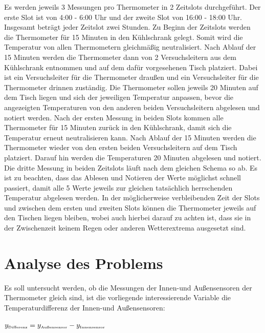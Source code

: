 \documentclass[ ngerman, fontsize= 12pt, paper=a4, headings=big, titlepage=true]{article}
\begin{document}
Es werden jeweils 3 Messungen pro Thermometer in 2 Zeitslots durchgeführt. Der erste Slot ist von 4:00 - 6:00 Uhr und der zweite Slot von 16:00 - 18:00 Uhr. Insgesamt beträgt jeder Zeitslot zwei Stunden. Zu Beginn der Zeitslots werden die Thermometer für 15 Minuten in den Kühlschrank gelegt. Somit wird die Temperatur von allen Thermometern gleichmäßig neutralisiert. Nach Ablauf der 15 Minuten werden die Thermometer dann von 2 Versuchsleitern aus dem Kühlschrank entnommen und auf dem dafür vorgesehenen Tisch platziert. Dabei ist ein Versuchsleiter für die Thermometer draußen und ein Versuchsleiter für die Thermometer drinnen zuständig. Die Thermometer sollen jeweils 20 Minuten auf dem Tisch liegen und sich der jeweiligen Temperatur anpassen, bevor die angezeigten Temperaturen von den anderen beiden Versuchsleitern abgelesen und notiert werden. Nach der ersten Messung in beiden Slots kommen alle Thermometer für 15 Minuten zurück in den Kühlschrank, damit sich die Temperatur erneut neutralisieren kann. Nach Ablauf der 15 Minuten werden die Thermometer wieder von den ersten beiden Versuchsleitern auf dem Tisch platziert. Darauf hin werden die Temperaturen 20 Minuten abgelesen und notiert. Die dritte Messung in beiden Zeitslots läuft nach dem gleichen Schema so ab. Es ist zu beachten, dass das Ablesen und Notieren der Werte möglichst schnell passiert, damit alle 5 Werte jeweils zur gleichen tatsächlich herrschenden Temperatur abgelesen werden. In der möglicherweise verbleibenden Zeit der Slots und zwischen dem ersten und zweiten Slots können die Thermometer jeweils auf den Tischen liegen bleiben, wobei auch hierbei darauf zu achten ist, dass sie in der Zwischenzeit keinem Regen oder anderen Wetterextrema ausgesetzt sind.



\section{Analyse des Problems}

Es soll untersucht werden, ob die Messungen der Innen-und Außensensoren der Thermometer gleich sind, ist die vorliegende interessierende Variable die Temperaturdifferenz der Innen-und Außensensoren:\\
\begin{center}
	$y_{\text{\tiny{Differenz}}} = y_{\text{\tiny{Außensensor}}}-y_{\text{\tiny{Innensensor}}} $
\end{center}
\end{document}
